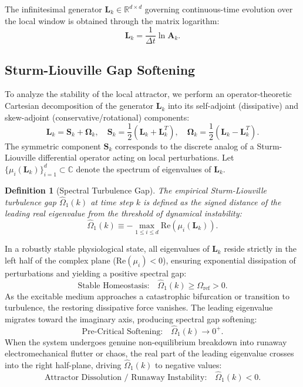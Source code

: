 \documentclass[11pt,a4paper]{article}
\newtheorem{definition}[theorem]{Definition}
\begin{document}
The infinitesimal generator $\bm{L}_k \in \mathbb{R}^{d \times d}$ governing continuous-time evolution over the local window is obtained through the matrix logarithm:
\begin{equation}
\bm{L}_k = \frac{1}{\Delta t} \ln \bm{A}_k.
\end{equation}

\subsection{Sturm-Liouville Gap Softening}

To analyze the stability of the local attractor, we perform an operator-theoretic Cartesian decomposition of the generator $\bm{L}_k$ into its self-adjoint (dissipative) and skew-adjoint (conservative/rotational) components:
\begin{equation}
\bm{L}_k = \bm{S}_k + \bm{\Omega}_k, \quad \bm{S}_k = \frac{1}{2}\left( \bm{L}_k + \bm{L}_k^T \right), \quad \bm{\Omega}_k = \frac{1}{2}\left( \bm{L}_k - \bm{L}_k^T \right).
\end{equation}
The symmetric component $\bm{S}_k$ corresponds to the discrete analog of a Sturm-Liouville differential operator acting on local perturbations. Let $\{\mu_i(\bm{L}_k)\}_{i=1}^d \subset \mathbb{C}$ denote the spectrum of eigenvalues of $\bm{L}_k$.

\begin{definition}[Spectral Turbulence Gap]
The empirical Sturm-Liouville turbulence gap $\hat{\Omega}_1(k)$ at time step $k$ is defined as the signed distance of the leading real eigenvalue from the threshold of dynamical instability:
\begin{equation}
\hat{\Omega}_1(k) \equiv -\max_{1 \le i \le d} \mathrm{Re}\left( \mu_i(\bm{L}_k) \right).
\end{equation}
\end{definition}

In a robustly stable physiological state, all eigenvalues of $\bm{L}_k$ reside strictly in the left half of the complex plane ($\mathrm{Re}(\mu_i) < 0$), ensuring exponential dissipation of perturbations and yielding a positive spectral gap:
\begin{equation}
\text{Stable Homeostasis:} \quad \hat{\Omega}_1(k) \ge \Omega_{\mathrm{ref}} > 0.
\end{equation}
As the excitable medium approaches a catastrophic bifurcation or transition to turbulence, the restoring dissipative force vanishes. The leading eigenvalue migrates toward the imaginary axis, producing spectral gap softening:
\begin{equation}
\text{Pre-Critical Softening:} \quad \hat{\Omega}_1(k) \to 0^+.
\end{equation}
When the system undergoes genuine non-equilibrium breakdown into runaway electromechanical flutter or chaos, the real part of the leading eigenvalue crosses into the right half-plane, driving $\hat{\Omega}_1(k)$ to negative values:
\begin{equation}
\text{Attractor Dissolution / Runaway Instability:} \quad \hat{\Omega}_1(k) < 0.
\end{equation}
\end{document}
